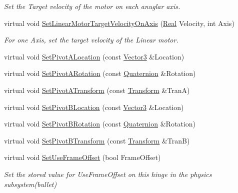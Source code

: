 \begin{DoxyCompactItemize}
\begin{DoxyCompactList}\small\item\em Set the Target velocity of the motor on each anuglar axis. \item\end{DoxyCompactList}\item 
virtual void \hyperlink{classphys_1_1Generic6DofConstraint_affa823620df06133b71b1bf04cc104a3}{SetLinearMotorTargetVelocityOnAxis} (\hyperlink{namespacephys_af7eb897198d265b8e868f45240230d5f}{Real} Velocity, int Axis)
\begin{DoxyCompactList}\small\item\em For one Axis, set the target velocity of the Linear motor. \item\end{DoxyCompactList}\item 
virtual void \hyperlink{classphys_1_1Generic6DofConstraint_a488cc8ca89d73ddeac7e9928354ca53d}{SetPivotALocation} (const \hyperlink{classphys_1_1Vector3}{Vector3} \&Location)
\item 
virtual void \hyperlink{classphys_1_1Generic6DofConstraint_af02e9aa94cf2bafbbd533372d9b69285}{SetPivotARotation} (const \hyperlink{classphys_1_1Quaternion}{Quaternion} \&Rotation)
\item 
virtual void \hyperlink{classphys_1_1Generic6DofConstraint_a6d6a3e092a98c4e689f001abb28bd3e6}{SetPivotATransform} (const \hyperlink{classphys_1_1Transform}{Transform} \&TranA)
\item 
virtual void \hyperlink{classphys_1_1Generic6DofConstraint_ac5ea8b4e757db0a622df37a334df9ee4}{SetPivotBLocation} (const \hyperlink{classphys_1_1Vector3}{Vector3} \&Location)
\item 
virtual void \hyperlink{classphys_1_1Generic6DofConstraint_a3e5fe94b3035c21ad2a1b55c7f1becb6}{SetPivotBRotation} (const \hyperlink{classphys_1_1Quaternion}{Quaternion} \&Rotation)
\item 
virtual void \hyperlink{classphys_1_1Generic6DofConstraint_a5216ec1b5d67dd12971d58c5aa03a52f}{SetPivotBTransform} (const \hyperlink{classphys_1_1Transform}{Transform} \&TranB)
\item 
virtual void \hyperlink{classphys_1_1Generic6DofConstraint_a5e3fcf0fe6d85ecad2a883010215e983}{SetUseFrameOffset} (bool FrameOffset)
\begin{DoxyCompactList}\small\item\em Set the stored value for UseFrameOffset on this hinge in the physics subsystem(bullet) \item\end{DoxyCompactList}\item 

\end{DoxyCompactItemize}

